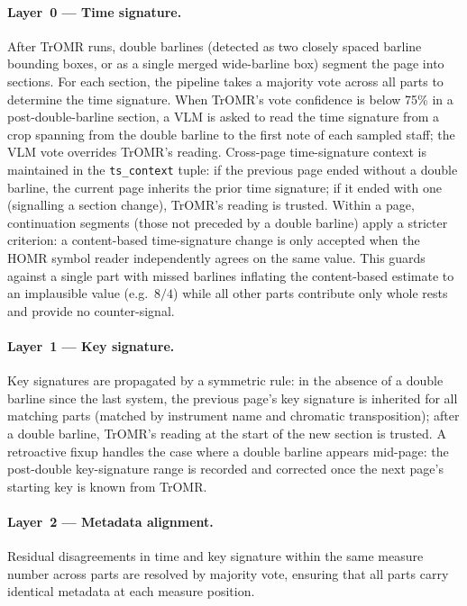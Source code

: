 \documentclass[11pt,a4paper]{article}
\begin{document}
\paragraph{Layer~0 --- Time signature.}
After TrOMR runs, double barlines (detected as two closely spaced barline bounding boxes, or as a single merged wide-barline box) segment the page into sections.
For each section, the pipeline takes a majority vote across all parts to determine the time signature.
When TrOMR's vote confidence is below 75\% in a post-double-barline section, a VLM is asked to read the time signature from a crop spanning from the double barline to the first note of each sampled staff; the VLM vote overrides TrOMR's reading.
Cross-page time-signature context is maintained in the \texttt{ts\_context} tuple: if the previous page ended without a double barline, the current page inherits the prior time signature; if it ended with one (signalling a section change), TrOMR's reading is trusted.
Within a page, continuation segments (those not preceded by a double barline) apply a stricter criterion: a content-based time-signature change is only accepted when the HOMR symbol reader independently agrees on the same value.
This guards against a single part with missed barlines inflating the content-based estimate to an implausible value (e.g.\ $8/4$) while all other parts contribute only whole rests and provide no counter-signal.

\paragraph{Layer~1 --- Key signature.}
Key signatures are propagated by a symmetric rule: in the absence of a double barline since the last system, the previous page's key signature is inherited for all matching parts (matched by instrument name and chromatic transposition); after a double barline, TrOMR's reading at the start of the new section is trusted.
A retroactive fixup handles the case where a double barline appears mid-page: the post-double key-signature range is recorded and corrected once the next page's starting key is known from TrOMR.

\paragraph{Layer~2 --- Metadata alignment.}
Residual disagreements in time and key signature within the same measure number across parts are resolved by majority vote, ensuring that all parts carry identical metadata at each measure position.
\end{document}
